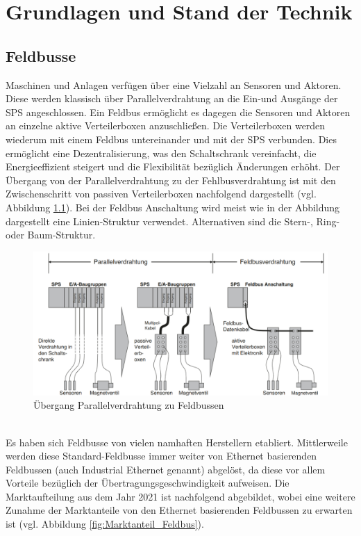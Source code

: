 \documentclass[ a4paper,
                oneside,
                toc=bibliography,
                toc=listof
                ]{scrbook}
\begin{document}
	\chapter{Grundlagen und Stand der Technik}
	
	\section{Feldbusse}
	Maschinen und Anlagen verfügen über eine Vielzahl an Sensoren und Aktoren. Diese werden klassisch über Parallelverdrahtung an die Ein-und Ausgänge der SPS angeschlossen. Ein Feldbus ermöglicht es dagegen die Sensoren und Aktoren an einzelne aktive Verteilerboxen anzuschließen. Die Verteilerboxen werden wiederum mit einem Feldbus untereinander und mit der SPS verbunden. Dies ermöglicht eine Dezentralisierung, was den Schaltschrank vereinfacht, die Energieeffizient steigert und die Flexibilität bezüglich Änderungen erhöht. Der Übergang von der Parallelverdrahtung zu der Fehlbusverdrahtung ist mit den Zwischenschritt von passiven Verteilerboxen nachfolgend dargestellt (vgl. Abbildung \ref{fig:Parallel_vs_Feldbus}). Bei der Feldbus Anschaltung wird meist wie in der Abbildung dargestellt eine Linien-Struktur verwendet. Alternativen sind die Stern-, Ring- oder Baum-Struktur. \cite{hering2012elektrotechnik}
	\begin{figure}[!ht]
		\centering
		\includegraphics[width=1.0\linewidth]{./images/Parallelverdrahtung_Feldbus.png}
		\caption{Übergang Parallelverdrahtung zu Feldbussen \cite{hering2012elektrotechnik}}
		\label{fig:Parallel_vs_Feldbus}
	\end{figure}\\
	Es haben sich Feldbusse von vielen namhaften Herstellern etabliert. Mittlerweile werden diese Standard-Feldbusse immer weiter von Ethernet basierenden Feldbussen (auch Industrial Ethernet genannt) abgelöst, da diese vor allem Vorteile bezüglich der Übertragungsgeschwindigkeit aufweisen. Die Marktaufteilung aus dem Jahr 2021 ist nachfolgend abgebildet, wobei eine weitere Zunahme der Marktanteile von den Ethernet basierenden Feldbussen zu erwarten ist (vgl. Abbildung \ref{fig:Marktanteil_Feldbus}). \cite{hering2012elektrotechnik} \cite{Marktanteile_HMS}\\
\end{document}
